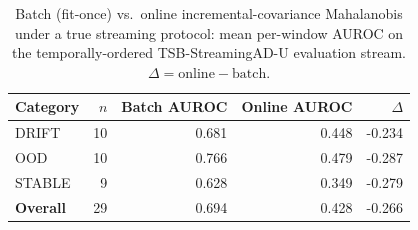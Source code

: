 \begin{table}[t]
\centering
\caption{Batch (fit-once) vs.\ online incremental-covariance Mahalanobis under a true streaming protocol: mean per-window AUROC on the temporally-ordered TSB-StreamingAD-U evaluation stream. $\Delta = \text{online} - \text{batch}$.}
\label{tab:online_incremental}
\begin{tabular}{lrrrr}
\toprule
Category & $n$ & Batch AUROC & Online AUROC & $\Delta$ \\
\midrule
DRIFT & 10 & 0.681 & 0.448 & -0.234 \\
OOD & 10 & 0.766 & 0.479 & -0.287 \\
STABLE & 9 & 0.628 & 0.349 & -0.279 \\
\midrule
\textbf{Overall} & 29 & 0.694 & 0.428 & -0.266 \\
\bottomrule
\end{tabular}
\end{table}
